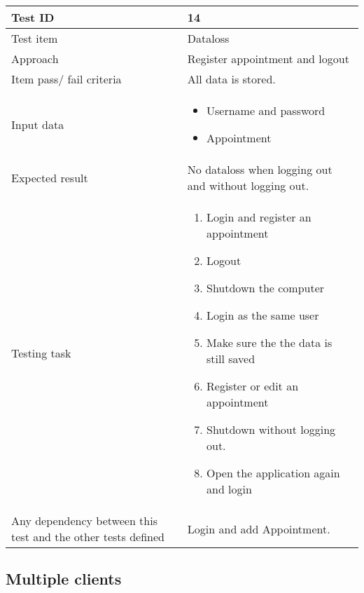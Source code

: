 \documentclass[a4paper, 10pt]{article}
\begin{document}
\begin{tabularx}{\textwidth}{ |X|X| }
\hline
\rowcolor{Gray}
Test ID & 14 \\ \hline
Test item & Dataloss \\ \hline
Approach & Register appointment and logout \\ \hline
Item pass/ fail criteria & All data is stored. \\ \hline
Input data &
\begin{itemize}
\item Username and password
 \item Appointment
\end{itemize}\\ \hline
Expected result &
No dataloss when logging out and without logging out. \\ \hline
Testing task &
\begin{enumerate}
    \item Login and register an appointment
    \item Logout
    \item Shutdown the computer
    \item Login as the same user
    \item Make sure the the data is still saved
    \item Register or edit an appointment
    \item Shutdown without logging out.
    \item Open the application again and login
\end{enumerate}\\ \hline
    
Any dependency between this test and the other tests defined & Login and add Appointment. \\ \hline

\end{tabularx}

\subsection{Multiple clients}
\end{document}
